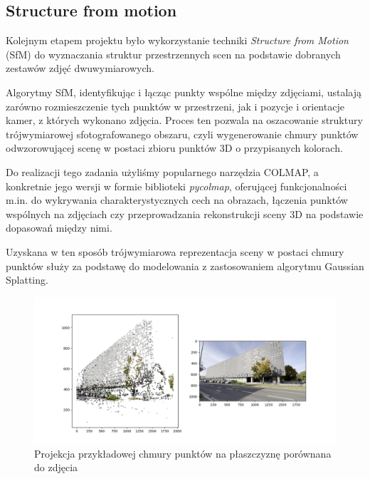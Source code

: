 \subsection{Structure from motion}
Kolejnym etapem projektu było wykorzystanie techniki \textit{Structure from Motion} (SfM) do wyznaczania
struktur przestrzennych scen na podstawie dobranych zestawów zdjęć dwuwymiarowych. 

Algorytmy SfM, identyfikując i łącząc 
punkty wspólne między zdjęciami, ustalają zarówno rozmieszczenie tych punktów w przestrzeni, jak i pozycje 
i orientacje kamer, z których wykonano zdjęcia. Proces ten pozwala na oszacowanie struktury trójwymiarowej
sfotografowanego obszaru, czyli wygenerowanie chmury punktów odwzorowującej scenę w postaci 
zbioru punktów 3D o przypisanych kolorach. 

Do realizacji tego zadania użyliśmy popularnego narzędzia COLMAP, a konkretnie jego wersji w formie biblioteki 
\textit{pycolmap}, oferującej funkcjonalności m.in. do wykrywania charakterystycznych cech na obrazach, 
łączenia punktów wspólnych na zdjęciach czy przeprowadzania rekonstrukcji sceny 3D na podstawie dopasowań 
między nimi.

Uzyskana w ten sposób trójwymiarowa reprezentacja sceny w postaci chmury punktów służy za podstawę do 
modelowania z zastosowaniem algorytmu Gaussian Splatting.

\begin{figure}[!ht]
    \centering
    \includegraphics[width=0.9\linewidth]{images/sfm.png}
    \caption{Projekcja przykładowej chmury punktów na płaszczyznę porównana do zdjęcia}
\end{figure}